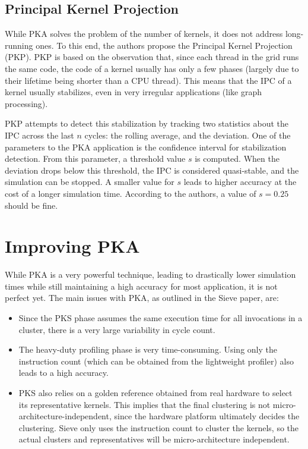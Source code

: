 \subsection{Principal Kernel Projection}\label{subsec:pkp}
While PKA solves the problem of the number of kernels, it does not address long-running ones.
To this end, the authors propose the Principal Kernel Projection (PKP).
PKP is based on the observation that, since each thread in the grid runs the same code, the code of a kernel usually has only a few phases (largely due to their lifetime being shorter than a CPU thread).
This means that the IPC of a kernel usually stabilizes, even in very irregular applications (like graph processing).

PKP attempts to detect this stabilization by tracking two statistics about the IPC across the last $n$ cycles: the rolling average, and the deviation.
One of the parameters to the PKA application is the confidence interval for stabilization detection.
From this parameter, a threshold value $s$ is computed.
When the deviation drops below this threshold, the IPC is considered quasi-stable, and the simulation can be stopped.
A smaller value for $s$ leads to higher accuracy at the cost of a longer simulation time.
According to the authors, a value of $s = 0.25$ should be fine.

\section{Improving PKA}\label{sec:improving-pka-sieve}
While PKA is a very powerful technique, leading to drastically lower simulation times while still maintaining a high accuracy for most application, it is not perfect yet.
The main issues with PKA, as outlined in the Sieve paper\cite{sieve}, are:
\begin{itemize}
    \item Since the PKS phase assumes the same execution time for all invocations in a cluster, there is a very large variability in cycle count.
    \item The heavy-duty profiling phase is very time-consuming.
    Using only the instruction count (which can be obtained from the lightweight profiler) also leads to a high accuracy.
    \item PKS also relies on a golden reference obtained from real hardware to select its representative kernels.
    This implies that the final clustering is not micro-architecture-independent, since the hardware platform ultimately decides the clustering.
    Sieve only uses the instruction count to cluster the kernels, so the actual clusters and representatives will be micro-architecture independent.
\end{itemize}

